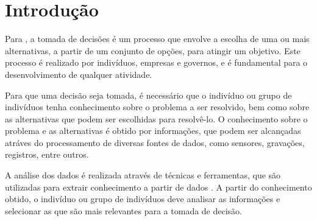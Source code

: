 

\chapter{Introdução}
  \label{cha:intro}

  Para \cite{tarapanoff1995tecnicas}, a tomada de decisões é um processo que envolve a escolha de uma ou mais alternativas, a partir de um conjunto de opções, para atingir um objetivo. Este processo é realizado por indivíduos, empresas e governos, e é fundamental para o desenvolvimento de qualquer atividade.

  Para que uma decisão seja tomada, é necessário que o indivíduo ou grupo de indivíduos tenha conhecimento sobre o problema a ser resolvido, bem como sobre as alternativas que podem ser escolhidas para resolvê-lo. O conhecimento sobre o problema e as alternativas é obtido por informações, que podem ser alcançadas atráves do processamento de diversas fontes de dados, como sensores, gravações, registros, entre outros.

  A análise dos dados é realizada através de técnicas e ferramentas, que são utilizadas para extrair conhecimento a partir de dados \cite{guimaraes2004sistema}. A partir do conhecimento obtido, o indivíduo ou grupo de indivíduos deve analisar as informações e selecionar as que são mais relevantes para a tomada de decisão.

  
  
  
  
  

